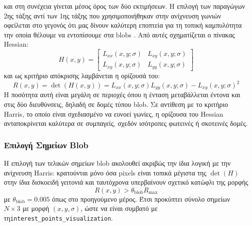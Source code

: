 \documentclass[12pt, a4paper]{article}
\begin{document}
και στη συνέχεια γίνεται μέσος όρος των δύο εκτιμήσεων.
Η επιλογή των παραγώγων 2ης τάξης αντί των 1ης τάξης που χρησιμοποιήθηκαν στην ανίχνευση γωνιών οφείλεται στο γεγονός ότι μας δίνουν καλύτερη εποπτεία για τη τοπική καμπυλότητα την οποία θέλουμε να εντοπίσουμε στα blobs \cite{maragos2005features}. 
Από αυτές σχηματίζεται ο πίνακας Hessian:
\begin{equation}
    H(x,y) =
    \begin{bmatrix}
        L_{xx}(x,y;\sigma) & L_{xy}(x,y;\sigma) \\
        L_{xy}(x,y;\sigma) & L_{yy}(x,y;\sigma)
    \end{bmatrix}
\end{equation}
και ως κριτήριο απόκρισης λαμβάνεται η ορίζουσά του:
\begin{equation}
    R(x,y) = \det(H(x,y))
           = L_{xx}(x,y;\sigma)L_{yy}(x,y;\sigma) - L_{xy}(x,y;\sigma)^2
\end{equation}
Η ποσότητα αυτή είναι μεγάλη σε περιοχές όπου η ένταση μεταβάλλεται έντονα
και στις δύο διευθύνσεις, δηλαδή σε δομές τύπου blob. Σε αντίθεση με το
κριτήριο Harris, το οποίο είναι σχεδιασμένο να ευνοεί γωνίες, η ορίζουσα του
Hessian ανταποκρίνεται καλύτερα σε συμπαγείς, σχεδόν ισότροπες φωτεινές ή
σκοτεινές δομές.

\subsubsection{Επιλογή Σημείων Blob}

Η επιλογή των τελικών σημείων blob ακολουθεί ακριβώς την ίδια λογική με την
ανίχνευση Harris: κρατούνται μόνο όσα pixels είναι τοπικά μέγιστα της
$\det(H)$ στην ίδια δισκοειδή γειτονιά και ταυτόχρονα υπερβαίνουν σχετικό
κατώφλι της μορφής
\begin{equation}
    R(x,y) > \theta_{\text{blob}} R_{\max}
\end{equation}
με $\theta_{\text{blob}} = 0.005$ όπως στο προηγούμενο μέρος. Έτσι προκύπτει σύνολο σημείων
$N \times 3$ με μορφή $(x,y,\sigma)$, ώστε να είναι συμβατό με  τη\texttt{interest\_points\_visualization}.
\end{document}

